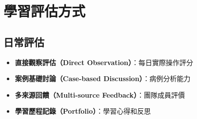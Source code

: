 \documentclass[12pt,a4paper]{article}
\begin{document}
\section{學習評估方式}

\subsection{日常評估}
\begin{itemize}[nosep]
    \item \textbf{直接觀察評估（Direct Observation）}：每日實際操作評分
    \item \textbf{案例基礎討論（Case-based Discussion）}：病例分析能力
    \item \textbf{多來源回饋（Multi-source Feedback）}：團隊成員評價
    \item \textbf{學習歷程記錄（Portfolio）}：學習心得和反思
\end{itemize}
\end{document}
